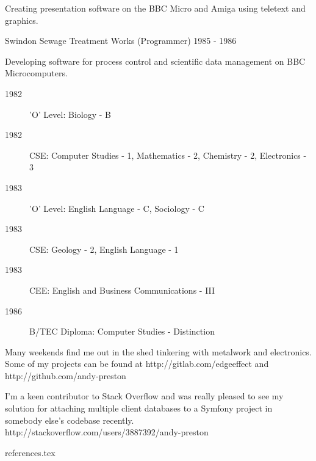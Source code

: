 Creating presentation software on the BBC Micro and Amiga
using teletext and graphics.

\jobHeading
    {Swindon Sewage Treatment Works (Programmer)}
    {1985 - 1986}

Developing software for process control and scientific data management
on BBC Microcomputers.



\begin{description}
    \item[1982] 'O' Level: Biology - B
    \item[1982] CSE: Computer Studies - 1, Mathematics - 2,
        Chemistry - 2, Electronics - 3
    \item[1983] 'O' Level: English Language - C, Sociology - C
    \item[1983] CSE: Geology - 2, English Language - 1
    \item[1983] CEE: English and Business Communications - III
\end{description}


\begin{description}
    \item[1986] B/TEC Diploma: Computer Studies - Distinction
\end{description}


Many weekends find me out in the shed tinkering with metalwork and electronics.
Some of my projects can be found at
http://gitlab.com/edgeeffect
and
http://github.com/andy-preston

I'm a keen contributor to Stack Overflow and was really pleased to
see my solution for attaching multiple client databases to a Symfony
project in somebody else's codebase recently.
http://stackoverflow.com/users/3887392/andy-preston


 {references.tex}
